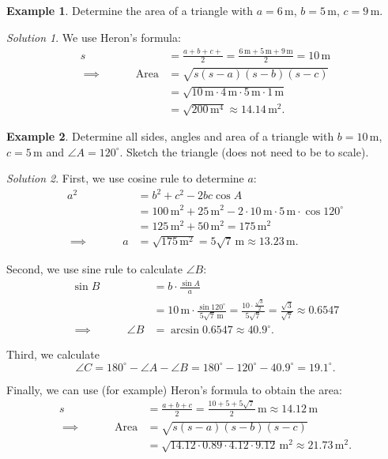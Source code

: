 \documentclass[
  english,
  12pt,
  oneside]{book}
\theoremstyle{definition}
\theoremstyle{definition}
\newtheorem{example}{Example}[chapter]
\theoremstyle{definition}
\theoremstyle{definition}
\theoremstyle{remark}
\newtheorem*{solution}{Solution}
\begin{document}
\begin{example}
Determine the area of a triangle with \(a=6\,\mathrm{m}\), \(b=5\,\mathrm{m}\), \(c=9\,\mathrm{m}\).
\end{example}

\begin{solution}
We use Heron's formula:
\begin{align*}
s&=\frac{a+b+c+}{2}=\frac{6\,\mathrm{m} + 5\,\mathrm{m}+ 9\,\mathrm{m}}{2}=10\,\mathrm{m}\\
\implies\quad\quad\quad\mathrm{Area} &= \sqrt{s(s-a)(s-b)(s-c)}\\
&= \sqrt{10\,\mathrm{m}\cdot 4\,\mathrm{m}\cdot 5\,\mathrm{m}\cdot 1\,\mathrm{m}} \\
&= \sqrt{200\,\mathrm{m^4}} \approx 14.14\,\mathrm{m^2}.
\end{align*}
\end{solution}

\begin{example}
Determine all sides, angles and area of a triangle with \(b=10\,\mathrm{m}\), \(c=5\,\mathrm{m}\) and \(\angle A=120^\circ\). Sketch the triangle (does not need to be to scale).
\end{example}

\begin{solution}
First, we use cosine rule to determine \(a\):
\begin{align*}
a^2 &= b^2+c^2-2bc\cos A\\
&= 100\,\mathrm{m^2} + 25 \,\mathrm{m^2} - 2\cdot 10\,\mathrm{m}\cdot 5\,\mathrm{m}\cdot \cos 120^\circ\\
&= 125\,\mathrm{m^2} + 50 \,\mathrm{m^2} = 175 \,\mathrm{m^2}\\
\implies\quad\quad\quad a &= \sqrt{175\,\mathrm{m^2}} =5\sqrt{7}\,\mathrm{m} \approx 13.23\,\mathrm{m}.
\end{align*}

Second, we use sine rule to calculate \(\angle B\):
\begin{align*}
\sin B &= b\cdot\frac{\sin A}{a}\\
&= 10\,\mathrm{m}\cdot \frac{\sin 120^\circ}{5\sqrt{7}\,\mathrm{m}} = \frac{10\cdot \frac{\sqrt{3}}{2}}{5\sqrt{7}} =\frac{\sqrt{3}}{\sqrt{7}}\approx 0.6547\\
\implies\quad\quad\quad \angle B &= \arcsin 0.6547 \approx 40.9^\circ.
\end{align*}

Third, we calculate
\[\angle C = 180^\circ - \angle A-\angle B = 180^\circ- 120^\circ - 40.9^\circ = 19.1^\circ.\]

Finally, we can use (for example) Heron's formula to obtain the area:
\begin{align*}
s &= \frac{a+b+c}{2} = \frac{10+5+5\sqrt{7}}{2}\,\mathrm{m} \approx 14.12\,\mathrm{m}\\
\implies\quad\quad\quad \mathrm{Area} &= 
\sqrt{s(s-a)(s-b)(s-c)}\\
&=\sqrt{14.12\cdot 0.89\cdot 4.12\cdot 9.12} \,\mathrm{m^2} \approx 21.73\,\mathrm{m^2}.
\end{align*}
\end{solution}
\end{document}
